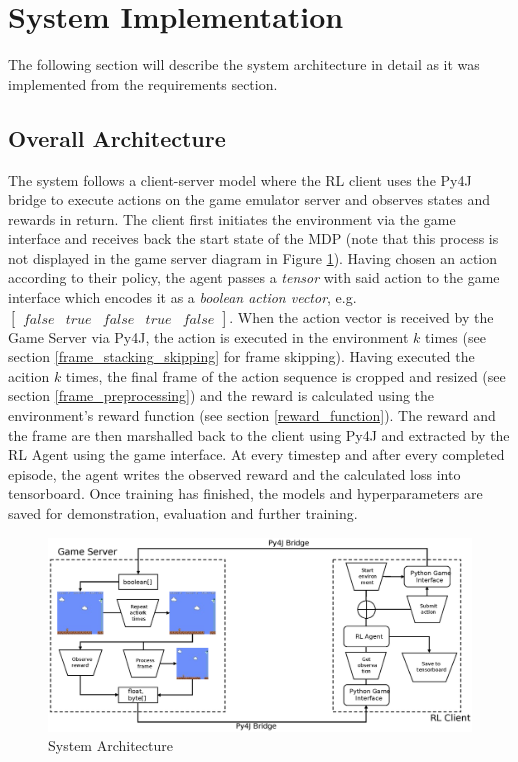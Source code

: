 \documentclass[notitlepage,a4paper,11pt]{article}
\begin{document}
	

\section{System Implementation}
The following section will describe the system architecture in detail as it was implemented from the requirements section.


\subsection{Overall Architecture}
The system follows a client-server model where the RL client uses the Py4J bridge to execute actions on the game emulator server and observes states and rewards in return. The client first initiates the environment via the game interface and receives back the start state of the MDP (note that this process is not displayed in the game server diagram in Figure \ref{fig:system_architecture}). Having chosen an action according to their policy, the agent passes a \textit{tensor} with said action to the game interface which encodes it as a \textit{boolean action vector}, e.g. $\begin{bmatrix} false & true & false & true & false\end{bmatrix}$. When the action vector is received by the Game Server via Py4J, the action is executed in the environment $k$ times (see section \ref{frame_stacking_skipping} for frame skipping). Having executed the acition $k$ times, the final frame of the action sequence is cropped and resized (see section \ref{frame_preprocessing}) and the reward is calculated using the environment's reward function (see section \ref{reward_function}). The reward and the frame are then marshalled back to the client using Py4J and extracted by the RL Agent using the game interface. At every timestep and after every completed episode, the agent writes the observed reward and the calculated loss into tensorboard. Once training has finished, the models and hyperparameters are saved for demonstration, evaluation and further training.

\begin{figure}[!htb]\label{fig:system_architecture}
\centering
\includegraphics[trim={0 2cm 0 2cm},clip,width=.75\linewidth]{figs/system_architecture.eps}
\caption{System Architecture}
\end{figure}
\end{document}
